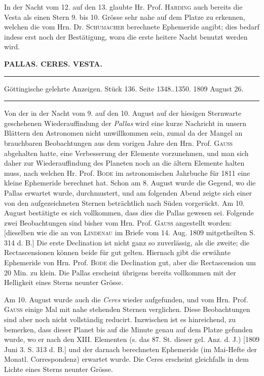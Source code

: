 \par\indent In der Nacht vom 12. auf den 13. glaubte Hr. Prof. \textsc{Harding} auch bereits die Vesta als einen Stern 9. bis 10. Grösse sehr nahe auf dem Platze zu erkennen, welchen die vom Hrn. Dr.
\textsc{Schumacher} berechnete Ephemeride angibt; dies bedarf indess erst noch der Bestätigung, wozu die erste heitere Nacht benutzt werden wird.

\clearpage
{}
\begin{center}
\textbf{PALLAS. CERES. VESTA.}
\par\vspace{4pt}\hrule\vspace{4pt}
\fontsize{10}{12}\selectfont Göttingische gelehrte Anzeigen. Stück 136. Seite 1348..1350. 1809 August 26.
\par\vspace{4pt}\hrule\vspace{4pt}
\end{center}

\par\indent Von der in der Nacht vom 9. auf den 10. August auf der hiesigen Sternwarte geschehenen Wiederauffindung der \emph{Pallas} wird eine kurze Nachricht in unsern Blättern den Astronomen nicht unwillkommen sein, zumal da der Mangel an brauchbaren Beobachtungen aus dem vorigen Jahre den Hrn. Prof. \textsc{Gauss} abgehalten hatte, eine Verbesserung der Elemente vorzunehmen, und man sich daher zur Wiederauffindung des Planeten noch an die ältern Elemente halten muss, nach welchen Hr. Prof.
\textsc{Bode} im astronomischen Jahrbuche für 1811 eine kleine Ephemeride berechnet hat. Schon am 8. August wurde die Gegend, wo die Pallas erwartet wurde, durchmustert, und am folgenden Abend zeigte sich einer von den aufgezeichneten Sternen beträchtlich nach Süden vorgerückt. Am 10. August bestätigte es sich vollkommen, dass dies die Pallas gewesen sei. Folgende zwei Beobachtungen sind bisher vom Hrn. Prof. \textsc{Gauss} angestellt worden: [dieselben wie die an von \textsc{Lindenau} im Briefe vom 14. Aug. 1809 mitgetheilten S. 314 d. B.] Die erste Declination ist nicht ganz so zuverlässig, als die zweite; die Rectascensionen können beide für gut gelten. Hiernach gibt die erwähnte Ephemeride von Hrn. Prof. \textsc{Bode} die Declination gut, aber die Rectascension um 20 Min. zu klein. Die Pallas erscheint übrigens bereits vollkommen mit der Helligkeit eines Sterns neunter Grösse.

\par\indent Am 10. August wurde auch die \emph{Ceres} wieder aufgefunden, und vom Hrn. Prof. \textsc{Gauss} einige Mal mit nahe stehenden Sternen verglichen. Diese Beobachtungen sind aber noch nicht vollständig reducirt. Inzwischen ist es hinreichend, zu bemerken, dass dieser Planet bis auf die Minute genau auf dem Platze gefunden wurde, wo er nach den XIII. Elementen (s. das 87. St. dieser gel. Anz. d. J.) [1809 Juni 3. S. 313 d. B.] und der darnach berechneten Ephemeride (im Mai-Hefte der Monatl. Correspondenz) erwartet wurde. Die Ceres erscheint gleichfalls in dem Lichte eines Sterns neunter Grösse.

